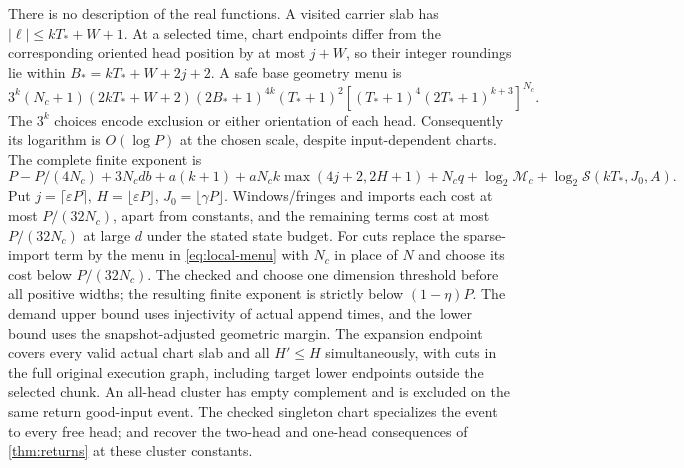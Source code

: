\begin{outline}
There is no description of the real functions. A visited carrier slab has
$|\ell|\le kT_*+W+1$. At a selected time, chart endpoints differ from the
corresponding oriented head position by at most $j+W$, so their integer
roundings lie within $B_*=kT_*+W+2j+2$. A safe base geometry menu is
\[
 3^k(N_c+1)(2kT_*+W+2)(2B_*+1)^{4k}(T_*+1)^2
 [(T_*+1)^4(2T_*+1)^{k+3}]^{N_c}.
\]
The $3^k$ choices encode exclusion or either orientation of each head.
Consequently its logarithm is $O(\log P)$ at the chosen scale, despite
input-dependent charts. The complete finite exponent is
\[
 P-P/(4N_c)+3N_cdb+a(k+1)
 +aN_ck\max(4j+2,2H+1)+N_cq
 +\log_2\mathcal M_c+\log_2\mathcal S(kT_*,J_0,A).
\]
Put $j=\lceil\varepsilon P\rceil$, $H=\lfloor\varepsilon P\rfloor$,
$J_0=\lfloor\gamma P\rfloor$. Windows/fringes and imports each cost at
most $P/(32N_c)$, apart from constants, and the remaining terms cost at most
$P/(32N_c)$ at large $d$ under the stated state budget. For cuts replace the
sparse-import term by the menu in \cref{eq:local-menu} with $N_c$ in place
of $N$ and choose its cost below $P/(32N_c)$. The checked  and 
choose one dimension threshold before all positive widths; the resulting
finite exponent is strictly below $(1-\eta)P$. The demand upper bound
uses injectivity of actual append times, and the lower bound uses the
snapshot-adjusted geometric margin. The expansion endpoint covers every
valid actual chart slab and all $H'\le H$ simultaneously, with cuts in the
full original execution graph, including target lower endpoints outside the
selected chunk. An all-head cluster has empty complement and is excluded
on the same return good-input event. The checked singleton chart specializes
the event to every free head;  and
 recover the two-head and one-head
consequences of \cref{thm:returns} at these cluster constants.
\end{outline}

